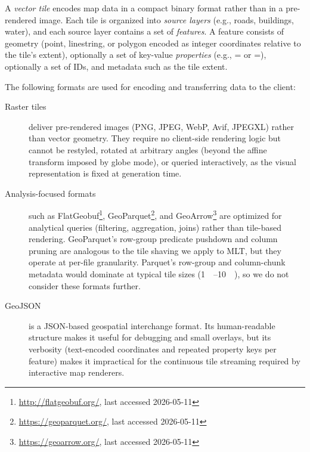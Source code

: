 A \emph{vector tile} encodes map data in a compact binary format rather than in a pre-rendered image.
Each tile is organized into \emph{source layers} (e.g., roads, buildings, water), and each source layer contains a set of \emph{features}.
A feature consists of geometry (point, linestring, or polygon encoded as integer coordinates relative to the tile's extent), optionally a set of key-value \emph{properties} (e.g., = or =), optionally a set of IDs, and metadata such as the tile extent.

The following formats are used for encoding and transferring data to the client:

\begin{description}
    \item[Raster tiles] deliver pre-rendered images (\ac{PNG}, JPEG, WebP, Avif, JPEGXL) rather than vector geometry.
    They require no client-side rendering logic but cannot be restyled, rotated at arbitrary angles (beyond the affine transform imposed by globe mode), or queried interactively, as the visual representation is fixed at generation time.

    \item[Analysis-focused formats] such as FlatGeobuf\footnote{\url{http://flatgeobuf.org/}, last accessed 2026-05-11}, GeoParquet\footnote{\url{https://geoparquet.org/}, last accessed 2026-05-11}, and GeoArrow\footnote{\url{https://geoarrow.org/}, last accessed 2026-05-11} are optimized for analytical queries (filtering, aggregation, joins) rather than tile-based rendering.
    GeoParquet's row-group predicate pushdown and column pruning are analogous to the tile shaving we apply to \ac{MLT}, but they operate at per-file granularity.
    Parquet's row-group and column-chunk metadata would dominate at typical tile sizes (\qtyrange{1}{10}{\kilo\byte}), so we do not consider these formats further.

    \item[\ac{GeoJSON}~\cite{butlerGeoJSONFormat2016}] is a \ac{JSON}-based geospatial interchange format.
    Its human-readable structure makes it useful for debugging and small overlays, but its verbosity (text-encoded coordinates and repeated property keys per feature) makes it impractical for the continuous tile streaming required by interactive map renderers.


\end{description}
